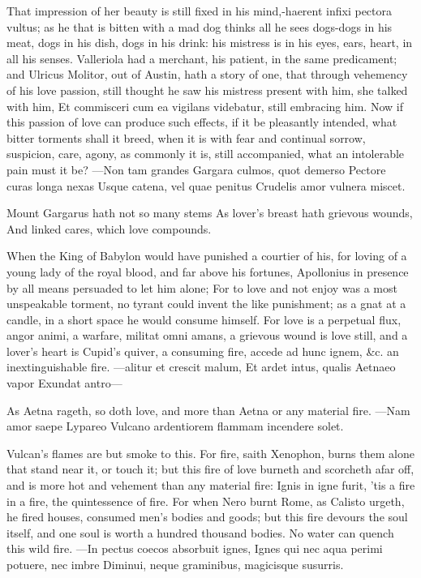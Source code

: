 {That impression of her beauty is still fixed in his mind,-haerent
infixi pectora vultus; as he that is bitten with a mad dog thinks all
he sees dogs-dogs in his meat, dogs in his dish, dogs in his drink: his
mistress is in his eyes, ears, heart, in all his senses. Valleriola had
a merchant, his patient, in the same predicament; and Ulricus
Molitor, out of Austin, hath a story of one, that through vehemency of
his love passion, still thought he saw his mistress present with him,
she talked with him, Et commisceri cum ea vigilans videbatur, still
embracing him.
Now if this passion of love can produce such effects, if it be
pleasantly intended, what bitter torments shall it breed, when it is
with fear and continual sorrow, suspicion, care, agony, as commonly it
is, still accompanied, what an intolerable pain must it be?
---Non tam grandes
Gargara culmos, quot demerso
Pectore curas longa nexas
Usque catena, vel quae penitus
Crudelis amor vulnera miscet.

Mount Gargarus hath not so many stems
As lover's breast hath grievous wounds,
And linked cares, which love compounds.

When the King of Babylon would have punished a courtier of his, for
loving of a young lady of the royal blood, and far above his fortunes,
 Apollonius in presence by all means persuaded to let him alone;
For to love and not enjoy was a most unspeakable torment, no tyrant
could invent the like punishment; as a gnat at a candle, in a short
space he would consume himself. For love is a perpetual flux,
angor animi, a warfare, militat omni amans, a grievous wound is love
still, and a lover's heart is Cupid's quiver, a consuming fire,
accede ad hunc ignem, \&c. an inextinguishable fire.
---alitur et crescit malum,
Et ardet intus, qualis Aetnaeo vapor
Exundat antro---

As Aetna rageth, so doth love, and more than Aetna or any material
fire.
---Nam amor saepe Lypareo
Vulcano ardentiorem flammam incendere solet.

Vulcan's flames are but smoke to this. For fire, saith Xenophon,
burns them alone that stand near it, or touch it; but this fire of love
burneth and scorcheth afar off, and is more hot and vehement than any
material fire: Ignis in igne furit, 'tis a fire in a fire, the
quintessence of fire. For when Nero burnt Rome, as Calisto urgeth, he
fired houses, consumed men's bodies and goods; but this fire devours
the soul itself, and one soul is worth a hundred thousand bodies.
No water can quench this wild fire.
---In pectus coecos absorbuit ignes,
Ignes qui nec aqua perimi potuere, nec imbre
Diminui, neque graminibus, magicisque susurris.


}
